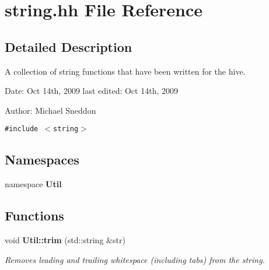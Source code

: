 \section{string.hh File Reference}
\label{string_8hh}


\subsection{Detailed Description}
A collection of string functions that have been written for the hive.

\begin{Desc}
\item[Date:]Oct 14th, 2009 last edited: Oct 14th, 2009\end{Desc}
\begin{Desc}
\item[Author:]Michael Sneddon \end{Desc}


{\tt \#include $<$string$>$}\par
\subsection*{Namespaces}
\begin{CompactItemize}
\item 
namespace {\bf Util}
\end{CompactItemize}
\subsection*{Functions}
\begin{CompactItemize}
\item 
void {\bf Util::trim} (std::string \&str)
\begin{CompactList}\small\item\em Removes leading and trailing whitespace (including tabs) from the string. \item\end{CompactList}\end{CompactItemize}
